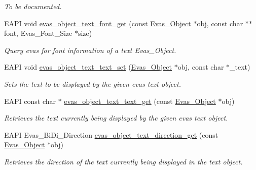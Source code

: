 \begin{DoxyCompactItemize}
\begin{DoxyCompactList}\small\item\em To be documented. \item\end{DoxyCompactList}\item 
EAPI void \hyperlink{group__Evas__Object__Text_gaa3ed4186d4a9a78c9ca95ea430dab242}{evas\_\-object\_\-text\_\-font\_\-get} (const \hyperlink{group__Evas__Object__Group_ga9e19e6dd1f517a0ba437c0114d3e7c97}{Evas\_\-Object} $\ast$obj, const char $\ast$$\ast$font, Evas\_\-Font\_\-Size $\ast$size)
\begin{DoxyCompactList}\small\item\em Query evas for font information of a text {\ttfamily Evas\_\-Object}. \item\end{DoxyCompactList}\item 
EAPI void \hyperlink{group__Evas__Object__Text_ga11d37807b5506e6cca746ebb91236532}{evas\_\-object\_\-text\_\-text\_\-set} (\hyperlink{group__Evas__Object__Group_ga9e19e6dd1f517a0ba437c0114d3e7c97}{Evas\_\-Object} $\ast$obj, const char $\ast$\_\-text)
\begin{DoxyCompactList}\small\item\em Sets the text to be displayed by the given evas text object. \item\end{DoxyCompactList}\item 
EAPI const char $\ast$ \hyperlink{group__Evas__Object__Text_gaef3b0b12eb63b9cd7574c1cf05afb7a8}{evas\_\-object\_\-text\_\-text\_\-get} (const \hyperlink{group__Evas__Object__Group_ga9e19e6dd1f517a0ba437c0114d3e7c97}{Evas\_\-Object} $\ast$obj)
\begin{DoxyCompactList}\small\item\em Retrieves the text currently being displayed by the given evas text object. \item\end{DoxyCompactList}\item 
EAPI Evas\_\-BiDi\_\-Direction \hyperlink{group__Evas__Object__Text_ga2fdb3ff0318cd4b45d642ae317b19589}{evas\_\-object\_\-text\_\-direction\_\-get} (const \hyperlink{group__Evas__Object__Group_ga9e19e6dd1f517a0ba437c0114d3e7c97}{Evas\_\-Object} $\ast$obj)
\begin{DoxyCompactList}\small\item\em Retrieves the direction of the text currently being displayed in the text object. \item\end{DoxyCompactList}\item 
$$
\end{DoxyCompactItemize}
